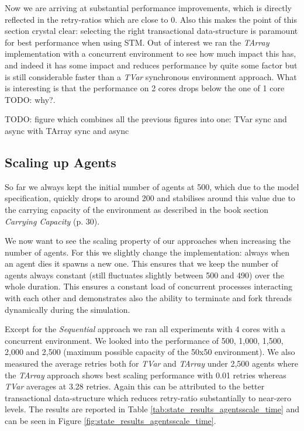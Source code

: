 Now we are arriving at substantial performance improvements, which is directly reflected in the retry-ratios which are close to 0. Also this makes the point of this section crystal clear: selecting the right transactional data-structure is paramount for best performance when using STM. Out of interest we ran the \textit{TArray} implementation with a concurrent environment to see how much impact this has, and indeed it has some impact and reduces performance by quite some factor but is still considerable faster than a \textit{TVar} synchronous environment approach. What is interesting is that the performance on 2 cores drops below the one of 1 core TODO: why?.

TODO: figure which combines all the previous figures into one: TVar sync and async with TArray sync and async

\subsection{Scaling up Agents}
So far we always kept the initial number of agents at 500, which due to the model specification, quickly drops to around 200 and stabilises around this value due to the carrying capacity of the environment as described in the book \cite{epstein_growing_1996} section \textit{Carrying Capacity} (p. 30).

We now want to see the scaling property of our approaches when increasing the number of agents. For this we slightly change the implementation: always when an agent dies it spawns a new one. This ensures that we keep the number of agents always constant (still fluctuates slightly between 500 and 490) over the whole duration. This ensures a constant load of concurrent processes interacting with each other and demonstrates also the ability to terminate and fork threads dynamically during the simulation.

Except for the \textit{Sequential} approach we ran all experiments with 4 cores with a concurrent environment. We looked into the performance of 500, 1,000, 1,500, 2,000 and 2,500 (maximum possible capacity of the 50x50 environment). We also measured the average retries both for \textit{TVar} and \textit{TArray} under 2,500 agents where the \textit{TArray} approach shows best scaling performance with 0.01 retries whereas \textit{TVar} averages at 3.28 retries. Again this can be attributed to the better transactional data-structure which reduces retry-ratio substantially to near-zero levels. The results are reported in Table \ref{tab:state_results_agentsscale_time} and can be seen in Figure \ref{fig:state_results_agentsscale_time}.

